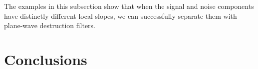 \par

\begin{comment}
The left plot in Figure~\ref{fig:ant-dat} shows another test example:
a shot gather from \cite{yilmaz}, which is contaminated by nearly
linear low-velocity noise. In this case, a simple dip-based separation
was sufficient for achieving a good result. The algorithm proceeds as
follows:
\begin{enumerate}
\item Bandpass the original data with an appropriate low-pass filter
  to obtain an initial noise estimate (the right plot in
  Figure~\ref{fig:ant-dat}.) 
\item Estimate the local noise dip from the initial noise model.
\item Estimate the signal dip from the input data as the complimentary
  dip component to the already known noise dip.
\item Estimate the noise by an iterative optimization of
  system~(\ref{eqn:s1}-\ref{eqn:s2}) and subtract it from the data to
  get the signal estimate.
\end{enumerate}
Figure~\ref{fig:ant-sn} shows the separation result. The signal and
noise components are accurately separated.


\par
\end{comment}

The examples in this subsection show that when the signal and noise
components have distinctly different local slopes, we can
successfully separate them with plane-wave destruction filters.

\section{Conclusions}

